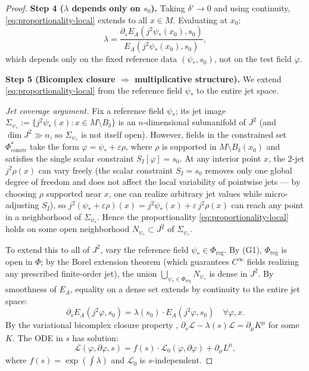 \documentclass[12pt,letterpaper]{article}
\theoremstyle{definition}
\newcommand{\mL}{\mathcal{L}}
\newcommand{\mPhi}{\Phi}
\newcommand{\mreg}{\mPhi_{\mathrm{reg}}}
\newcommand{\eps}{\varepsilon}
\newcommand{\EA}{E_A}
\newcommand{\jphi}{j^2\varphi}
\begin{document}
\begin{proof}
\textbf{Step 4 ($\lambda$ depends only on $s_0$).} Taking $\delta' \to 0$ and using continuity, \eqref{eq:proportionality-local} extends to all $x \in M$. Evaluating at $x_0$:
\[ \lambda = \frac{\partial_s \EA(j^2\psi_*(x_0), s_0)}{\EA(j^2\psi_*(x_0), s_0)}, \]
which depends only on the fixed reference data $(\psi_*, s_0)$, not on the test field $\varphi$.

\textbf{Step 5 (Bicomplex closure $\Rightarrow$ multiplicative structure).} We extend \eqref{eq:proportionality-local} from the reference field $\psi_*$ to the entire jet space.

\emph{Jet coverage argument.} Fix a reference field $\psi_*$; its jet image $\Sigma_{\psi_*} := \{j^2\psi_*(x) : x \in M \setminus B_\delta\}$ is an $n$-dimensional submanifold of $J^2$ (and $\dim J^2 \gg n$, so $\Sigma_{\psi_*}$ is not itself open). However, fields in the constrained set $\Phi^*_{\mathrm{constr}}$ take the form $\varphi = \psi_* + \eps\rho$, where $\rho$ is supported in $M \setminus B_\delta(x_0)$ and satisfies the single scalar constraint $S_I[\varphi] = s_0$. At any interior point $x$, the 2-jet $j^2\rho(x)$ can vary freely (the scalar constraint $S_I = s_0$ removes only one global degree of freedom and does not affect the local variability of pointwise jets --- by choosing $\rho$ supported near $x$, one can realize arbitrary jet values while micro-adjusting $S_I$), so $j^2(\psi_* + \eps\rho)(x) = j^2\psi_*(x) + \eps\, j^2\rho(x)$ can reach any point in a neighborhood of $\Sigma_{\psi_*}$. Hence the proportionality \eqref{eq:proportionality-local} holds on some open neighborhood $N_{\psi_*} \subset J^2$ of $\Sigma_{\psi_*}$.

To extend this to all of $J^2$, vary the reference field $\psi_* \in \mreg$. By  (G1), $\mreg$ is open in $\mPhi$; by the Borel extension theorem (which guarantees $C^\infty$ fields realizing any prescribed finite-order jet), the union $\bigcup_{\psi_* \in \mreg} N_{\psi_*}$ is dense in $J^2$. By smoothness of $\EA$, equality on a dense set extends by continuity to the entire jet space:
\[ \partial_s \EA(\jphi, s_0) = \lambda(s_0) \cdot \EA(\jphi, s_0) \quad \forall \varphi, x. \]
By the variational bicomplex closure property \cite[Thm 4.7]{Olver1993}, $\partial_s \mL - \lambda(s) \mL = \partial_\mu K^\mu$ for some $K$. The ODE in $s$ has solution:
\[ \mL(\varphi, \partial\varphi, s) = f(s) \cdot \mL_0(\varphi, \partial\varphi) + \partial_\mu L^\mu, \]
where $f(s) = \exp(\int \lambda)$ and $\mL_0$ is $s$-independent.


\end{proof}
\end{document}
